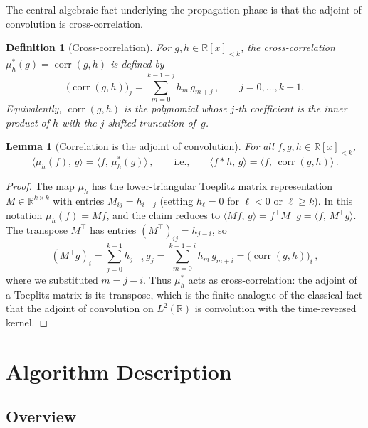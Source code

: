 \documentclass[11pt]{article}
\newtheorem{lemma}[theorem]{Lemma}
\newtheorem{definition}[theorem]{Definition}
\DeclareMathOperator{\corr}{corr}
\newcommand{\ip}[2]{\langle #1,\, #2 \rangle}
\begin{document}
The central algebraic fact underlying the propagation phase is that the
adjoint of convolution is cross-correlation.

\begin{definition}[Cross-correlation]
For $g, h \in \mathbb{R}[x]_{<k}$, the cross-correlation
$\mu_h^*(g) = \corr(g, h)$ is defined by
\begin{equation}\label{eq:corr-def}
  \bigl(\corr(g, h)\bigr)_j
  = \sum_{m=0}^{k-1-j} h_m \, g_{m+j}\,,
  \qquad j = 0, \ldots, k-1.
\end{equation}
Equivalently, $\corr(g, h)$ is the polynomial whose $j$-th coefficient is
the inner product of $h$ with the $j$-shifted truncation of~$g$.
\end{definition}

\begin{lemma}[Correlation is the adjoint of convolution]
\label{lem:adj-conv}
For all $f, g, h \in \mathbb{R}[x]_{<k}$,
\begin{equation}\label{eq:adj-identity}
  \ip{\mu_h(f)}{g} = \ip{f}{\mu_h^*(g)}\,,
  \qquad\text{i.e.,}\qquad
  \ip{f * h}{g} = \ip{f}{\corr(g, h)}\,.
\end{equation}
\end{lemma}
\begin{proof}
The map $\mu_h$ has the lower-triangular Toeplitz matrix representation
$M \in \mathbb{R}^{k \times k}$ with entries $M_{ij} = h_{i-j}$ (setting
$h_\ell = 0$ for $\ell < 0$ or $\ell \ge k$).  In this notation
$\mu_h(f) = Mf$, and the claim reduces to
$\ip{Mf}{g} = f^\top M^\top g = \ip{f}{M^\top g}$.
The transpose $M^\top$ has entries $(M^\top)_{ij} = h_{j-i}$, so
\[
  (M^\top g)_i
  = \sum_{j=0}^{k-1} h_{j-i}\, g_j
  = \sum_{m=0}^{k-1-i} h_m\, g_{m+i}
  = \bigl(\corr(g, h)\bigr)_i\,,
\]
where we substituted $m = j - i$.  Thus $\mu_h^*$ acts as
cross-correlation: the adjoint of a Toeplitz matrix is its transpose,
which is the finite analogue of the classical fact that the adjoint of
convolution on $L^2(\mathbb{R})$ is convolution with the time-reversed
kernel.
\end{proof}

\section{Algorithm Description}\label{sec:algorithm}

\subsection{Overview}
\end{document}
